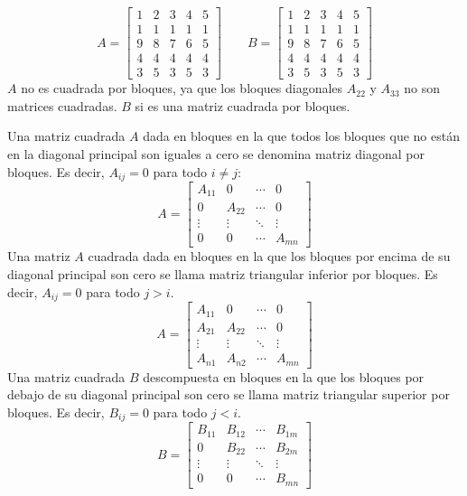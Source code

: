\[
  A = \left[\begin{array}{cc|cc|c}
    1 & 2 & 3 & 4 & 5 \\
    1 & 1 & 1 & 1 & 1 \\
    \hline
    9 & 8 & 7 & 6 & 5 \\
    \hline
    4 & 4 & 4 & 4 & 4 \\
    3 & 5 & 3 & 5 & 3
  \end{array}\right] \qquad B = \left[\begin{array}{cc|cc|c}
        1 & 2 & 3 & 4 & 5 \\
    1 & 1 & 1 & 1 & 1 \\
    \hline
    9 & 8 & 7 & 6 & 5 \\
    4 & 4 & 4 & 4 & 4 \\
    \hline
    3 & 5 & 3 & 5 & 3
  \end{array}\right]
\]
\(A\) no es cuadrada por bloques, ya que los bloques diagonales \(A_{22}\) y \(A_{33}\) no son matrices cuadradas. \(B\) si es una matriz cuadrada por bloques.

Una matriz cuadrada \(A\) dada en bloques en la que todos los bloques que no están en la diagonal principal son iguales a cero se denomina matriz diagonal por bloques. Es decir, \(A_{ij} = 0\) para todo \(i \neq j\):\[
A = \begin{bmatrix}
  A_{11} & 0 & \cdots & 0 \\
  0 & A_{22} & \cdots & 0 \\
  \vdots & \vdots & \ddots & \vdots \\
  0 & 0 & \cdots & A_{mn}
\end{bmatrix}
\]
Una matriz \(A\) cuadrada dada en bloques en la que los bloques por encima de su diagonal principal son cero se llama matriz triangular inferior por bloques. Es decir, \(A_{ij} = 0\) para todo \(j > i\).
\[
A = \begin{bmatrix}
  A_{11} & 0 & \cdots & 0 \\
  A_{21} & A_{22} & \cdots & 0 \\
  \vdots & \vdots & \ddots & \vdots \\
  A_{n1} & A_{n2} & \cdots & A_{mn}
\end{bmatrix}
\]
Una matriz cuadrada \(B\) descompuesta en bloques en la que los bloques por debajo de su diagonal principal son cero se llama matriz triangular superior por bloques. Es decir, \(B_{ij} = 0\) para todo \(j < i\).
\[
B = \begin{bmatrix}
  B_{11} & B_{12} & \cdots & B_{1m} \\
  0 & B_{22} & \cdots & B_{2m} \\
  \vdots & \vdots & \ddots & \vdots \\
  0 & 0 & \cdots & B_{mn}
\end{bmatrix}
\]

